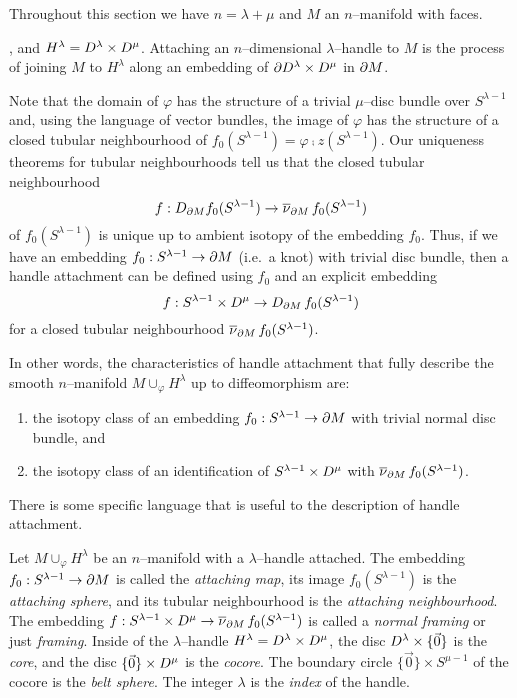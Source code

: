 Throughout this section we have $n=\lambda+\mu$ and $M$ an $n$--manifold with faces.




, and $H^\lambda=D^\lambda\times D^\mu$.
Attaching an $n$--dimensional $\lambda$--handle to $M$ is the process of joining $M$ to $H^\lambda$ along an embedding of $\partial D^\lambda\times D^\mu$ in $\partial M$. 





Note that the domain of $\varphi$ has the structure of a trivial $\mu$--disc bundle over $S^{\lambda-1}$ and, using the language of vector bundles, the image of $\varphi$ has the structure of a closed tubular neighbourhood of $f_0(S^{\lambda-1})=\varphi\comp z(S^{\lambda-1})$.
Our uniqueness theorems for tubular neighbourhoods tell us that the closed tubular neighbourhood
\[
	f:D_{\partial M}f_0(S^{\lambda-1})\to\overline{\nu}_{\partial M}\,f_0(S^{\lambda-1})
\]
of $f_0(S^{\lambda-1})$ is unique up to ambient isotopy of the embedding $f_0$.
Thus, if we have an embedding $f_0:S^{\lambda-1}\to \partial M$ (i.e.\ a knot) with trivial disc bundle, then a handle attachment can be defined using $f_0$ and an explicit embedding 
\[
	f: S^{\lambda-1}\times D^\mu\to D_{\partial M}\,f_0(S^{\lambda-1})
\]
for a closed tubular neighbourhood $\overline{\nu}_{\partial M}\,f_0(S^{\lambda-1})$.

In other words, the characteristics of handle attachment that fully describe the smooth $n$--manifold $M\cup_\varphi H^\lambda$ up to diffeomorphism are:
\begin{enumerate}
	\item the isotopy class of an embedding $f_0:S^{\lambda-1}\to\partial M$ with trivial normal disc bundle, and 
	\item the isotopy class of an identification of $S^{\lambda-1}\times D^\mu$ with $\overline{\nu}_{\partial M}\,f_0(S^{\lambda-1})$.
\end{enumerate}

There is some specific language that is useful to the description of handle attachment.

\begin{defn}
	Let $M\cup_\varphi H^\lambda$ be an $n$--manifold with a $\lambda$--handle attached.
	The embedding $f_0:S^{\lambda-1}\to\partial M$ is called the \emph{attaching map}, its image $f_0(S^{\lambda-1})$ is the \emph{attaching sphere}, and its tubular neighbourhood is the \emph{attaching neighbourhood}.
	The embedding $f: S^{\lambda-1}\times D^\mu\to \overline{\nu}_{\partial M}\,f_0(S^{\lambda-1})$ is called a \emph{normal framing} or just \emph{framing}.
	Inside of the $\lambda$--handle $H^\lambda=D^\lambda\times D^\mu$, the disc $D^\lambda\times\{\vec{0}\}$ is the \emph{core}, and the disc $\{\vec{0}\}\times D^\mu$ is the \emph{cocore}.
	The boundary circle $\{\vec{0}\}\times S^{\mu-1}$ of the cocore is the \emph{belt sphere}.
	The integer $\lambda$ is the \emph{index} of the handle.
\end{defn}

